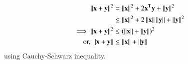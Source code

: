 	\begin{align}
		\norm{\vec{x}+\vec{y}}^2 &= \norm{\vec{x}}^2+2\vec{x^Ty}+\norm{\vec{y}}^2\\
&\le \norm{\vec{x}}^2+2\norm{\vec{x}}\norm{\vec{y}}+\norm{\vec{y}}^2\\
\implies 	\norm{\vec{x}+\vec{y}}^2 &\leq \brak{\norm{\vec{x}} + \norm{\vec{y}}}^2\\
\text{or, }		\norm{\vec{x}+\vec{y}} &\le  \norm{\vec{x}} + \norm{\vec{y}}
	\end{align}
using Cauchy-Schwarz inequality.
